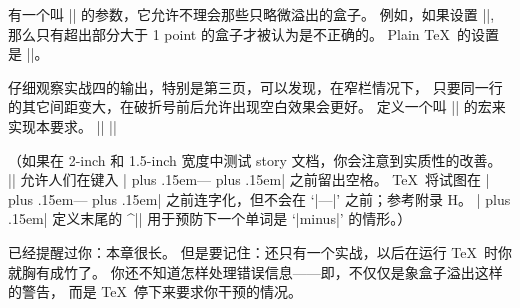 \danger 有一个叫 |\hfuzz| 的参数，它允许不理会那些只略微溢出的盒子。%
例如，如果设置 |\hfuzz=1pt|,
那么只有超出部分大于 1 point 的盒子才被认为是不正确的。%
Plain \TeX\ 的设置是 |\hfuzz=0.1pt|。

\ddangerexercise 仔细观察实战四的输出，特别是第三页，可以发现，在窄栏情况下，
只要同一行的其它间距变大，在破折号前后允许出现空白效果会更好。%
定义一个叫 |\dash| 的宏来实现本要求。
\answer |\def\extraspace{\nobreak \hskip 0pt plus .15em\relax}|\parbreak
|\def\dash{\unskip\extraspace---\extraspace}|\par\nobreak\smallskip\noindent
（如果在 2-inch 和 1.5-inch 宽度中测试 story 文档，你会注意到实质性的改善。
|\unskip| 允许人们在键入 |\dash| 之前留出空格。
\TeX\ 将试图在 |\dash| 之前连字化，但不会在 `|---|' 之前；参考附录 H。
|\extraspace| 定义末尾的 ^|\relax| 用于预防下一个单词是 `|minus|' 的情形。）

已经提醒过你：本章很长。%
但是要记住：还只有一个实战，以后在运行 \TeX\ 时你就胸有成竹了。%
你还不知道怎样处理错误信息——即，不仅仅是象盒子溢出这样的警告，
而是 \TeX\ 停下来要求你干预的情况。

